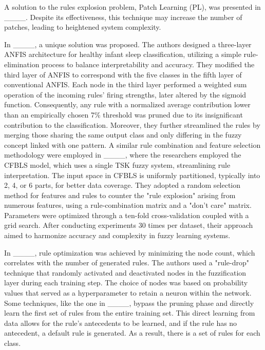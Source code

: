 A solution to the rules explosion problem, Patch Learning (PL), was presented in ____. Despite its effectiveness, this technique may increase the number of patches, leading to heightened system complexity.

In ____, a unique solution was proposed. The authors designed a three-layer ANFIS architecture for healthy infant sleep classification, utilizing a simple rule-elimination process to balance interpretability and accuracy. They modified the third layer of ANFIS to correspond with the five classes in the fifth layer of conventional ANFIS. Each node in the third layer performed a weighted sum operation of the incoming rules' firing strengths, later altered by the sigmoid function. Consequently, any rule with a normalized average contribution lower than an empirically chosen 7\% threshold was pruned due to its insignificant contribution to the classification.
Moreover, they further streamlined the rules by merging those sharing the same output class and only differing in the fuzzy concept linked with one pattern. A similar rule combination and feature selection methodology were employed in ____, where the researchers employed the CFBLS model, which uses a single TSK fuzzy system, streamlining rule interpretation. The input space in CFBLS is uniformly partitioned, typically into 2, 4, or 6 parts, for better data coverage. They adopted a random selection method for features and rules to counter the "rule explosion" arising from numerous features, using a rule-combination matrix and a "don't care" matrix. Parameters were optimized through a ten-fold cross-validation coupled with a grid search. After conducting experiments 30 times per dataset, their approach aimed to harmonize accuracy and complexity in fuzzy learning systems.

In ____, rule optimization was achieved by minimizing the node count, which correlates with the number of generated rules. The authors used a "rule-drop" technique that randomly activated and deactivated nodes in the fuzzification layer during each training step. The choice of nodes was based on probability values that served as a hyperparameter to retain a neuron within the network.
Some techniques, like the one in ____, bypass the pruning phase and directly learn the first set of rules from the entire training set. This direct learning from data allows for the rule's antecedents to be learned, and if the rule has no antecedent, a default rule is generated. As a result, there is a set of rules for each class.

